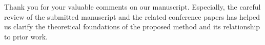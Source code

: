 \documentclass[12pt,english]{reviewresponse}
\begin{document}
\begin{concludingresponse}[]
	Thank you for your valuable comments on our manuscript. 
  Especially, the careful review of the submitted manuscript and the related conference papers has helped us clarify the theoretical foundations of the proposed method and its relationship to prior work.
\end{concludingresponse}


\newpage
% 


\end{document}
